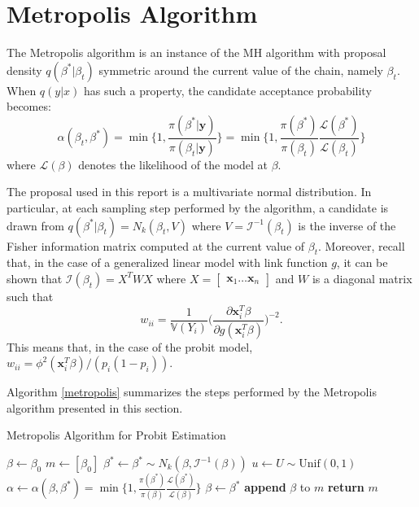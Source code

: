 \documentclass{article}
\newcommand{\V}[0]{\mathbb{V}}
\renewcommand{\vec}[1]{\mathbf{#1}}
\begin{document}
\section{Metropolis Algorithm}
The Metropolis algorithm is an instance of the MH algorithm with proposal density \(q(\beta^*|\beta_t)\) symmetric around the current value of the chain, namely \(\beta_t\). When \(q(y|x)\) has such a property, the candidate acceptance probability becomes:
\begin{equation*}
    \alpha(\beta_t, \beta^*) = \min\Bigg\{1, \frac{\pi(\beta^*|\vec{y})}{\pi(\beta_t|\vec{y})}\Bigg\} = \min\Bigg\{1, \frac{\pi(\beta^*)}{\pi(\beta_t)}\frac{\mathcal{L}(\beta^*)}{\mathcal{L}(\beta_t)}\Bigg\}
\end{equation*}
where \(\mathcal{L}(\beta)\) denotes the likelihood of the model at \(\beta\).
\par
The proposal used in this report is a multivariate normal distribution. In particular, at each sampling step performed by the algorithm, a candidate is drawn from \(q(\beta^*|\beta_t) = N_k(\beta_t,V)\) where \(V = \mathcal{I}^{-1}(\beta_t)\) is the inverse of the Fisher information matrix computed at the current value of \(\beta_t\). Moreover, recall that, in the case of a generalized linear model with link function \(g\), it can be shown that \(\mathcal{I}(\beta_t) = X^T W X\) where \(X = \begin{bmatrix} \vec{x}_1 \hdots \vec{x}_n \end{bmatrix}\) and \(W\) is a diagonal matrix such that 
\begin{equation*}
    w_{ii} = \frac{1}{\V(Y_i)}\bigg(\frac{\partial \vec{x}_i^T \beta}{\partial g(\vec{x}_i^T \beta)}\bigg)^{-2}.
\end{equation*}
This means that, in the case of the probit model, \(w_{ii} = \phi^2(\vec{x}_i^T \beta)/(p_i(1 - p_i))\).
\par 
Algorithm \ref{metropolis} summarizes the steps performed by the Metropolis algorithm presented in this section.

\begin{algorithm}
\caption{Metropolis Algorithm for Probit Estimation}\label{metropolis}
\begin{algorithmic}[1]
    \State $\beta \gets \beta_0$
    \State $m \gets [\beta_0]$
    \Repeat
        \State $\beta^* \gets \beta^* \sim N_k(\beta,\mathcal{I}^{-1}(\beta))$
        \State $u \gets U \sim \text{Unif}(0, 1)$
        \State $\alpha \gets \alpha(\beta, \beta^*) = \min\big\{1, \frac{\pi(\beta^*)}{\pi(\beta)}\frac{\mathcal{L}(\beta^*)}{\mathcal{L}(\beta)}\big\}$
            \State $\beta \gets \beta^*$
        \EndIf
        \State \textbf{append} $\beta$ to $m$
    \State \textbf{return} $m$
\EndProcedure
\end{algorithmic}
\end{algorithm}
\end{document}
